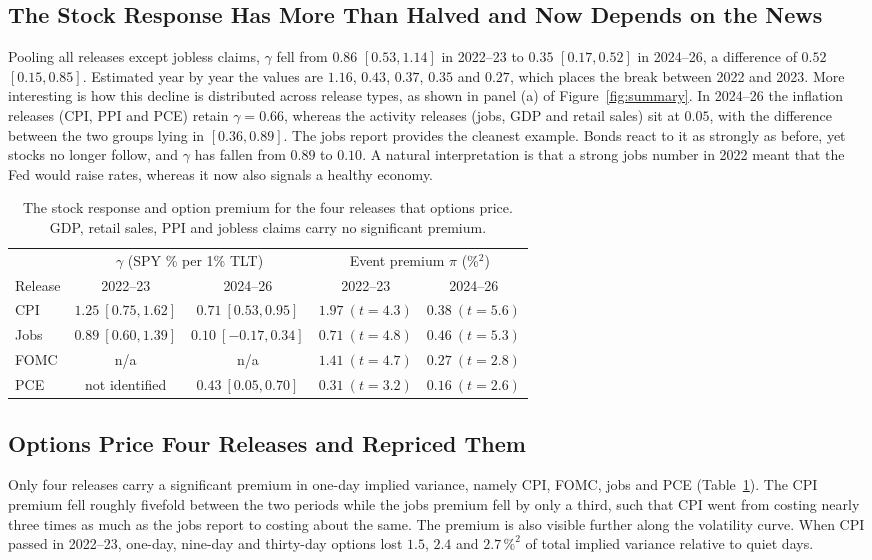 \documentclass[10pt]{article}
\begin{document}
\subsection{The Stock Response Has More Than Halved and Now Depends on the News}
Pooling all releases except jobless claims, $\gamma$ fell from $0.86$ $[0.53,1.14]$ in 2022--23 to $0.35$ $[0.17,0.52]$ in 2024--26, a difference of $0.52$ $[0.15,0.85]$. Estimated year by year the values are $1.16$, $0.43$, $0.37$, $0.35$ and $0.27$, which places the break between 2022 and 2023. More interesting is how this decline is distributed across release types, as shown in panel (a) of Figure~\ref{fig:summary}. In 2024--26 the inflation releases (CPI, PPI and PCE) retain $\gamma=0.66$, whereas the activity releases (jobs, GDP and retail sales) sit at $0.05$, with the difference between the two groups lying in $[0.36,0.89]$. The jobs report provides the cleanest example. Bonds react to it as strongly as before, yet stocks no longer follow, and $\gamma$ has fallen from $0.89$ to $0.10$. A natural interpretation is that a strong jobs number in 2022 meant that the Fed would raise rates, whereas it now also signals a healthy economy.

\begin{table}[h]
\centering\small
\begin{tabular}{lcccc}
\toprule
 & \multicolumn{2}{c}{$\gamma$ (SPY \% per 1\% TLT)} & \multicolumn{2}{c}{Event premium $\pi$ (\%$^2$)}\\
\cmidrule(lr){2-3}\cmidrule(lr){4-5}
Release & 2022--23 & 2024--26 & 2022--23 & 2024--26\\
\midrule
CPI  & $1.25\ [0.75,1.62]$ & $0.71\ [0.53,0.95]$ & $1.97\ (t=4.3)$ & $0.38\ (t=5.6)$\\
Jobs & $0.89\ [0.60,1.39]$ & $0.10\ [-0.17,0.34]$ & $0.71\ (t=4.8)$ & $0.46\ (t=5.3)$\\
FOMC & n/a & n/a & $1.41\ (t=4.7)$ & $0.27\ (t=2.8)$\\
PCE  & not identified & $0.43\ [0.05,0.70]$ & $0.31\ (t=3.2)$ & $0.16\ (t=2.6)$\\
\bottomrule
\end{tabular}
\caption{The stock response and option premium for the four releases that options price. GDP, retail sales, PPI and jobless claims carry no significant premium.}
\label{tab:main}
\end{table}

\subsection{Options Price Four Releases and Repriced Them}
Only four releases carry a significant premium in one-day implied variance, namely CPI, FOMC, jobs and PCE (Table~\ref{tab:main}). The CPI premium fell roughly fivefold between the two periods while the jobs premium fell by only a third, such that CPI went from costing nearly three times as much as the jobs report to costing about the same. The premium is also visible further along the volatility curve. When CPI passed in 2022--23, one-day, nine-day and thirty-day options lost $1.5$, $2.4$ and $2.7\,\%^2$ of total implied variance relative to quiet days.
\end{document}
